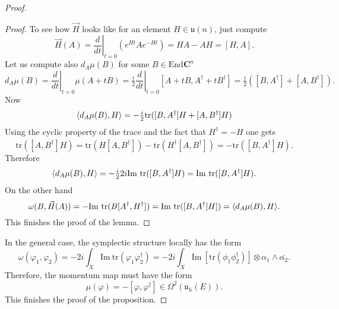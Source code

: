 \documentclass[12pt,a4paper]{book}
\theoremstyle{definition} \newtheorem{defn}[thm]{Definition}
\theoremstyle{definition} \newtheorem{ejemplo}[thm]{Example}
\theoremstyle{remark} \newtheorem{rem}[thm]{Remark}
\def\CC{\mathbf{C}}
\def\tr{\mathrm{tr}}
\def\End{\mathrm{End}}
\def\uu{\mathfrak{u}}
\DeclarePairedDelimiter\esc{\langle}{\rangle}
\begin{document}
\begin{proof}
\begin{proof}
	      To see how $\vec{H}$ looks like for an element $H\in \mathfrak{u}(n)$, just compute
	      \begin{equation*}
		\vec{H}(A)=\left.\frac{d}{dt} \right|_{t=0} (e^{Ht}Ae^{-Ht})=HA-AH=[H,A].
	      \end{equation*}
	      Let us compute also $d_{A}\mu(B)$ for some $B \in \End \CC^n$
	      \begin{equation*}
		d_A \mu(B) =\left.\frac{d}{dt} \right|_{t=0} \mu(A+tB)=\tfrac{i}{2}\left.\frac{d}{dt} \right|_{t=0}    [A+tB,A^{\dagger}+tB^\dagger]=\tfrac{i}{2} \left([B,A^{\dagger}] + [A,B^{\dagger}]\right).
	      \end{equation*}
	      Now
	      \begin{equation*}
		\esc{d_A\mu(B),H}=-\tfrac{i}{2} \tr([B,A^\dagger]H+[A,B^{\dagger}]H)
	      \end{equation*}
	      Using the cyclic property of the trace and the fact that $H^\dagger=-H$  one gets
	      \begin{equation*}
		\tr([A,B^\dagger]H)=\tr(H[A,B^\dagger])-\tr(H^\dagger[A,B^\dagger])=-\overline{\tr([B,A^\dagger]H)}.
	      \end{equation*}
Therefore
	      \begin{equation*}
		\esc{d_A\mu(B),H}=- \tfrac{i}{2}2i \mathrm{Im}\ \tr([B,A^\dagger]H)=  \mathrm{Im}\ \tr([B,A^\dagger]H).
	      \end{equation*}
	      On the other hand
	      \begin{equation*}
		\omega(B,\vec{H}(A))=-\mathrm{Im}\ \tr(B[A^\dagger,H^\dagger])=\mathrm{Im}\ \tr([B,A^\dagger]H])=\esc{d_A\mu(B),H}.
	      \end{equation*}
	      This finishes the proof of the lemma.
	    \end{proof}
	    In the general case, the symplectic structure locally has the form
	    \begin{equation*}
	    \omega(\varphi_1,\varphi_2)=-2i \int_X \mathrm{Im}\  \tr(\varphi_1\varphi_2^\dagger)=-2i \int_X \mathrm{Im}\ [\tr(\phi_1\phi_2^\dagger)] \otimes \alpha_1 \wedge \bar{\alpha_2}.
	    \end{equation*}
	    Therefore, the momentum map must have the form
	    \begin{equation*}
	      \mu(\varphi)=-[\varphi,\varphi^\dagger] \in \Omega^2(\uu_h(E)).
	    \end{equation*}
	    This finishes the proof of the proposition.
	  \end{proof}
\end{document}
